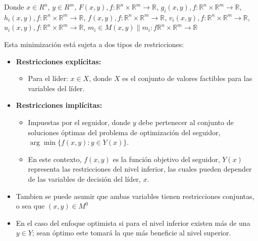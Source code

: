 Donde 
$x \in R^{n}$, $y \in R^{m}$, 
$F(x,y), f : \mathbb{R}^{n} \times \mathbb{R}^{m} \to \mathbb{R}$,
$g_i(x,y) , f : \mathbb{R}^{n} \times \mathbb{R}^{m} \to \mathbb{R} $,
$h_i(x,y) , f : \mathbb{R}^{n} \times \mathbb{R}^{m} \to \mathbb{R} $,
$f(x,y), f : \mathbb{R}^{n} \times \mathbb{R}^{m} \to \mathbb{R}$,
$v_i(x,y) , f : \mathbb{R}^{n} \times \mathbb{R}^{m} \to \mathbb{R} $,
$u_i(x,y) , f : \mathbb{R}^{n} \times \mathbb{R}^{m} \to \mathbb{R} $,
$m_i \in M(x,y) \| m_i : f \mathbb{R}^{n} \times \mathbb{R}^{m} \to \mathbb{R}$

\newpage


Esta minimización está sujeta a dos tipos de restricciones: 
\begin{itemize}
    \item \textbf{Restricciones explícitas:}
    \begin{itemize}
        \item Para el líder: $x \in X$, donde $X$ es el conjunto de valores factibles para las variables del líder.
    \end{itemize}
    
    \item \textbf{Restricciones implícitas:}
    \begin{itemize}
        \item Impuestas por el seguidor, donde $y$ debe pertenecer al conjunto de soluciones óptimas del problema de optimización del seguidor, $\arg\min\{f(x, y) : y \in Y(x)\}$.
        \item En este contexto, $f(x, y)$ es la función objetivo del seguidor, $Y(x)$ representa las restricciones del nivel inferior, las cuales pueden depender de las variables de decisión del líder, $x$.
    \end{itemize}
	\item Tambien se puede asumir que ambas variables tienen restricciones conjuntas, o sea que $(x,y) \in M^0$
    \item En el caso del enfoque optimista si para el nivel inferior existen más de una $y \in Y$; sean óptimo este tomará la que más beneficie al nivel superior. 
\end{itemize}


